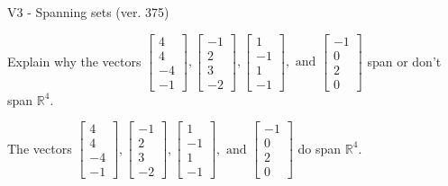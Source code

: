\begin{exercise}
  \begin{exerciseTitle}V3 - Spanning sets (ver. 375)\end{exerciseTitle}
  \begin{exerciseStatement}
    Explain why the vectors \(\left[\begin{array}{r}
4 \\
4 \\
-4 \\
-1
\end{array}\right] , \left[\begin{array}{r}
-1 \\
2 \\
3 \\
-2
\end{array}\right] , \left[\begin{array}{r}
1 \\
-1 \\
1 \\
-1
\end{array}\right] , \text{ and } \left[\begin{array}{r}
-1 \\
0 \\
2 \\
0
\end{array}\right]\) span or don't span \(\mathbb{R}^4\). 
	


  \end{exerciseStatement}
  \begin{exerciseAnswer}
   The vectors \(\left[\begin{array}{r}
4 \\
4 \\
-4 \\
-1
\end{array}\right] , \left[\begin{array}{r}
-1 \\
2 \\
3 \\
-2
\end{array}\right] , \left[\begin{array}{r}
1 \\
-1 \\
1 \\
-1
\end{array}\right] , \text{ and } \left[\begin{array}{r}
-1 \\
0 \\
2 \\
0
\end{array}\right]\) 
  	 do  
	span \(\mathbb{R}^4\).
  


  \end{exerciseAnswer}
\end{exercise}
